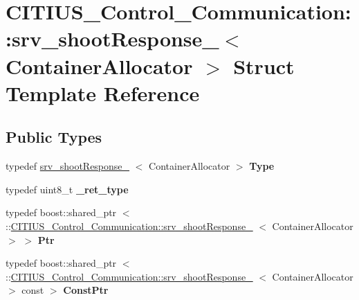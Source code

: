 \hypertarget{struct_c_i_t_i_u_s___control___communication_1_1srv__shoot_response__}{\section{\-C\-I\-T\-I\-U\-S\-\_\-\-Control\-\_\-\-Communication\-:\-:srv\-\_\-shoot\-Response\-\_\-$<$ \-Container\-Allocator $>$ \-Struct \-Template \-Reference}
\label{struct_c_i_t_i_u_s___control___communication_1_1srv__shoot_response__}
}
\subsection*{\-Public \-Types}
\begin{DoxyCompactItemize}
\item 
\hypertarget{struct_c_i_t_i_u_s___control___communication_1_1srv__shoot_response___a54c6515c7afbda2d0f0236899e1ba495}{typedef \hyperlink{struct_c_i_t_i_u_s___control___communication_1_1srv__shoot_response__}{srv\-\_\-shoot\-Response\-\_\-}\*
$<$ \-Container\-Allocator $>$ {\bfseries \-Type}}\label{struct_c_i_t_i_u_s___control___communication_1_1srv__shoot_response___a54c6515c7afbda2d0f0236899e1ba495}

\item 
\hypertarget{struct_c_i_t_i_u_s___control___communication_1_1srv__shoot_response___acf6aa6d67f84a603028a9943cb76d2e1}{typedef uint8\-\_\-t {\bfseries \-\_\-ret\-\_\-type}}\label{struct_c_i_t_i_u_s___control___communication_1_1srv__shoot_response___acf6aa6d67f84a603028a9943cb76d2e1}

\item 
\hypertarget{struct_c_i_t_i_u_s___control___communication_1_1srv__shoot_response___a022a1b00e2146468a735f15e7e271426}{typedef boost\-::shared\-\_\-ptr\*
$<$ \-::\hyperlink{struct_c_i_t_i_u_s___control___communication_1_1srv__shoot_response__}{\-C\-I\-T\-I\-U\-S\-\_\-\-Control\-\_\-\-Communication\-::srv\-\_\-shoot\-Response\-\_\-}\*
$<$ \-Container\-Allocator $>$ $>$ {\bfseries \-Ptr}}\label{struct_c_i_t_i_u_s___control___communication_1_1srv__shoot_response___a022a1b00e2146468a735f15e7e271426}

\item 
\hypertarget{struct_c_i_t_i_u_s___control___communication_1_1srv__shoot_response___a5d6280ac8cbc69ca12be7e4e7d7f74b4}{typedef boost\-::shared\-\_\-ptr\*
$<$ \-::\hyperlink{struct_c_i_t_i_u_s___control___communication_1_1srv__shoot_response__}{\-C\-I\-T\-I\-U\-S\-\_\-\-Control\-\_\-\-Communication\-::srv\-\_\-shoot\-Response\-\_\-}\*
$<$ \-Container\-Allocator $>$ const  $>$ {\bfseries \-Const\-Ptr}}\label{struct_c_i_t_i_u_s___control___communication_1_1srv__shoot_response___a5d6280ac8cbc69ca12be7e4e7d7f74b4}

\end{DoxyCompactItemize}

